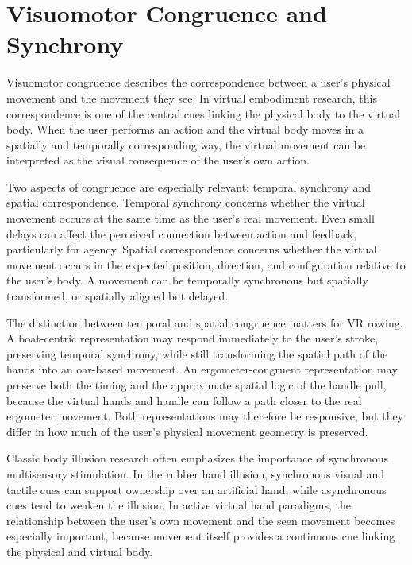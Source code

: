 \section{Visuomotor Congruence and Synchrony}
\label{sec:background_visuomotor_congruence}

Visuomotor congruence describes the correspondence between a user's physical movement and the movement they see. In virtual embodiment research, this correspondence is one of the central cues linking the physical body to the virtual body. When the user performs an action and the virtual body moves in a spatially and temporally corresponding way, the virtual movement can be interpreted as the visual consequence of the user's own action.

Two aspects of congruence are especially relevant: temporal synchrony and spatial correspondence. Temporal synchrony concerns whether the virtual movement occurs at the same time as the user's real movement. Even small delays can affect the perceived connection between action and feedback, particularly for agency. Spatial correspondence concerns whether the virtual movement occurs in the expected position, direction, and configuration relative to the user's body. A movement can be temporally synchronous but spatially transformed, or spatially aligned but delayed.

The distinction between temporal and spatial congruence matters for VR rowing. A boat-centric representation may respond immediately to the user's stroke, preserving temporal synchrony, while still transforming the spatial path of the hands into an oar-based movement. An ergometer-congruent representation may preserve both the timing and the approximate spatial logic of the handle pull, because the virtual hands and handle can follow a path closer to the real ergometer movement. Both representations may therefore be responsive, but they differ in how much of the user's physical movement geometry is preserved.

Classic body illusion research often emphasizes the importance of synchronous multisensory stimulation. In the rubber hand illusion, synchronous visual and tactile cues can support ownership over an artificial hand, while asynchronous cues tend to weaken the illusion. In active virtual hand paradigms, the relationship between the user's own movement and the seen movement becomes especially important, because movement itself provides a continuous cue linking the physical and virtual body.

